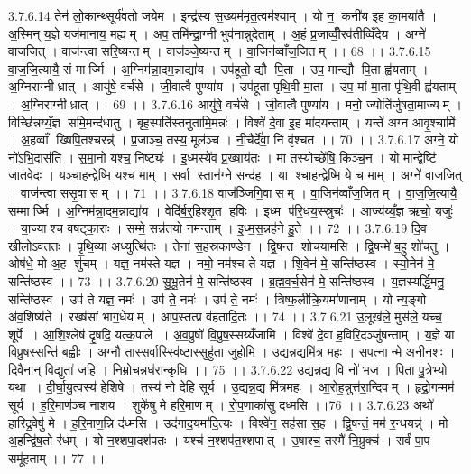 3.7.6.14
तेन॑ लो॒कान्थ्सूर्य॑वतो जयेम । इन्द्र॑स्य स॒ख्यम॑मृत॒त्वम॑श्याम् । यो न॒ कनी॑य इ॒ह का॒मया॑तै । अ॒स्मिन् य॒ज्ञे यज॑मानाय॒ मह्यम् । अप॒ तमि॑न्द्रा॒ग्नी भुव॑नान्नुदेताम् । अ॒हं प्र॒जाव्वीँ॒रव॑तीव्विँदेय । अग्ने॑ वाजजित् । वाज॑न्त्वा सरि॒ष्यन्तम् । वाज॑ञ्जे॒ष्यन्तम् । वा॒जिन॑व्वाँज॒जितम् ।। 68 ।।
3.7.6.15
वा॒ज॒जि॒त्यायै॒ सं मार्ज्मि । अ॒ग्निम॑न्ना॒दम॒न्नाद्या॑य । उप॑हूतो॒ द्यौ पि॒ता । उप॒ मान्द्यौ पि॒ता ह्व॑यताम् । अ॒ग्निराग्नीध्रात् । आयु॑षे॒ वर्च॑से । जी॒वात्वै पुण्या॑य । उप॑हूता पृथि॒वी मा॒ता । उप॒ मां मा॒ता पृ॑थि॒वी ह्व॑यताम् । अ॒ग्निराग्नीध्रात् ।। 69 ।।
3.7.6.16
आयु॑षे॒ वर्च॑से । जी॒वात्वै पुण्या॑य । मनो॒ ज्योति॑र्जुषता॒माज्यम् । विच्छि॑न्नय्यँ॒ज्ञ समि॒मन्द॑धातु । बृह॒स्पति॑स्तनुतामि॒मन्नः॑ । विश्वे॑ दे॒वा इ॒ह मा॑दयन्ताम् । यन्ते॑ अग्न आवृ॒श्चामि॑ । अ॒हव्वाँ ख्षिपि॒तश्चरन्न्॑ । प्र॒जाञ्च॒ तस्य॒ मूल॑ञ्च । नी॒चैर्दे॑वा॒ नि वृ॑श्चत ।। 70 ।।
3.7.6.17
अग्ने॒ यो नो॑ऽभि॒दास॑ति । स॒मा॒नो यश्च॒ निष्ट्यः॑ । इ॒ध्मस्ये॑व प्र॒ख्षाय॑तः । मा तस्योच्छे॑षि॒ किञ्च॒न । यो मान्द्वेष्टि॑ जातवेदः । यञ्चा॒हन्द्वेष्मि॒ यश्च॒ माम् । सर्वा॒॒ स्तान॑ग्ने॒ सन्द॑ह । या श्चा॒हन्द्वेष्मि॒ ये च॒ माम् । अग्ने॑ वाजजित् । वाज॑न्त्वा ससृ॒वासम् ।। 71 ।।
3.7.6.18
वाज॑ञ्जिगि॒वासम् । वा॒जिन॑व्वाँज॒जितम् । वा॒ज॒जि॒त्यायै॒ सम्मार्ज्मि । अ॒ग्निम॑न्ना॒दम॒न्नाद्या॑य । वेदि॑र्ब॒र्॒हिश्शृ॒त ह॒विः । इ॒ध्म प॑रि॒धय॒स्स्रुचः॑ । आज्य॑य्यँ॒ज्ञ ऋचो॒ यजुः॑ । या॒ज्याश्च वषट्का॒राः । सम्मे॒ सन्न॑तयो नमन्ताम् । इ॒ध्म॒स॒न्नह॑ने हु॒ते ।। 72 ।।
3.7.6.19
दि॒व खीलोऽव॑ततः । पृ॒थि॒व्या अध्युत्थि॑तः । तेना॑ स॒हस्र॑काण्डेन । द्वि॒षन्त॑ शोचयामसि । द्वि॒षन्मे॑ ब॒हु शो॑चतु । ओष॑धे॒ मो अ॒ह शु॑चम् । यज्ञ॒ नम॑स्ते यज्ञ । नमो॒ नम॑श्च ते यज्ञ । शि॒वेन॑ मे॒ सन्ति॑ष्ठस्व । स्यो॒नेन॑ मे॒ सन्ति॑ष्ठस्व ।। 73 ।।
3.7.6.20
सु॒भू॒तेन॑ मे॒ सन्ति॑ष्ठस्व । ब्र॒ह्म॒व॒र्च॒सेन॑ मे॒ सन्ति॑ष्ठस्व । य॒ज्ञस्यर्द्धि॒मनु॒ सन्ति॑ष्ठस्व । उप॑ ते यज्ञ॒ नमः॑ । उप॑ ते॒ नमः॑ । उप॑ ते॒ नमः॑ । त्रिष्फ॒लीक्रि॒यमा॑णानाम् । यो न्य॒ङ्गो अ॑व॒शिष्य॑ते । रख्ष॑सां भाग॒धेयम् । आप॒स्तत्प्र व॑हतादि॒तः ।। 74 ।।
3.7.6.21
उ॒लूख॑ले॒ मुस॑ले॒ यच्च॒ शूर्पे । आ॒शि॒श्लेष॑ दृ॒षदि॒ यत्क॒पाले । अ॒व॒प्रुषो॑ वि॒प्रुष॒स्सय्यँ॑जामि । विश्वे॑ दे॒वा ह॒विरि॒दञ्जु॑षन्ताम् । य॒ज्ञे या वि॒प्रुष॒स्सन्ति॑ ब॒ह्वीः । अ॒ग्नौ तास्सर्वा॒स्स्वि॑ष्टा॒स्सुहु॑ता जुहोमि । उ॒द्यन्न॒द्यमि॑त्र महः । स॒पत्नान्मे अनीनशः । दिवै॑नान् वि॒द्युता॑ जहि । नि॒म्रोच॒न्नध॑रान्कृधि ।। 75 ।।
3.7.6.22
उ॒द्यन्न॒द्य वि नो॑ भज । पि॒ता पु॒त्रेभ्यो॒ यथा । दी॒र्घा॒यु॒त्वस्य॑ हेशिषे । तस्य॑ नो देहि सूर्य । उ॒द्यन्न॒द्य मि॑त्रमहः । आ॒रोह॒न्नुत्त॑रा॒न्दिवम् । हृ॒द्रो॒गम्मम॑ सूर्य । ह॒रि॒माण॑ञ्च नाशय । शुके॑षु मे हरि॒माणम् । रो॒प॒णाका॑सु दध्मसि ।।76 ।।
3.7.6.23
अथो॑ हारिद्र॒वेषु॑ मे । ह॒रि॒माण॒न्नि द॑ध्मसि । उद॑गाद॒यमा॑दि॒त्यः । विश्वे॑न॒ सह॑सा स॒ह । द्वि॒षन्तं॒ मम॑ र॒न्धयन्न्॑ । मो अ॒हन्द्वि॑ष॒तो र॑धम् । यो न॒श्शपा॒दश॑पतः । यश्च॑ न॒श्शप॑त॒श्शपात् । उ॒षाश्च॒ तस्मै॑ नि॒म्रुक्च॑ । सर्वं॑ पा॒प समू॑हताम् ।। 77 ।।
